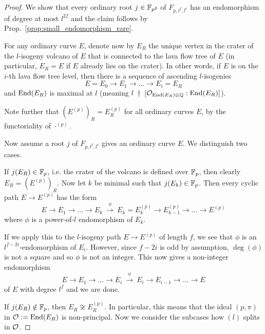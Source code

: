 \begin{proof}
    We show that every ordinary root $j \in \mathbb{F}_{p^2}$ of $F_{p, l^f, l^e}$ has an endomorphism of degree at most $l^{2f}$ and the claim follows by Prop.~\ref{prop:small_endomorphism_rare}.

    For any ordinary curve $E$, denote now by $E_R$ the unique vertex in the crater of the $l$-isogeny volcano of $E$ that is connected to the lava flow tree of $E$ (in particular, $E_R = E$ if $E$ already lies on the crater).
    In other words, if $E$ is on the $i$-th lava flow tree level, then there is a sequence of ascending $l$-isogenies
    \begin{equation*}
        E = E_0 \to E_1 \to ... \to E_i = E_R
    \end{equation*}
    and $\mathrm{End}(E_R)$ is maximal at $l$ (meaning $l \ \nmid \  [\mathcal{O}_{\mathrm{End}(E_R) \otimes \mathbb{Q}} : \mathrm{End}(E_R)]$).

    Note further that $(E^{(p)})_R = E_R^{(p)}$ for all ordinary curves $E$, by the functoriality of $\cdot^{(p)}$.

    Now assume a root $j$ of $F_{p, l^f, l^e}$ gives an ordinary curve $E$.
    We distinguish two cases.

    If $j(E_R) \in \mathbb{F}_p$, i.e. the crater of the volcano is defined over $\mathbb{F}_p$, then clearly $E_R = (E^{(p)})_R$.
    Now let $k$ be minimal such that $j(E_k) \in \mathbb{F}_p$.
    Then every cyclic path $E \to E^{(p)}$ has the form
    \begin{equation*}
        E \to E_1 \to ... \to E_k \ \overset{\phi}{\longrightarrow} \ E_k = E_k^{(p)} \to E_{k - 1}^{(p)} \to ... \to E^{(p)}
    \end{equation*}
    where $\phi$ is a power-of-$l$ endomorphism of $E_k$.

    If we apply this to the $l$-isogeny path $E \to E^{(p)}$ of length $f$, we see that $\phi$ is an $l^{f - 2i}$-endomorphism of $E_i$.
    However, since $f - 2i$ is odd by assumption, $\deg(\phi)$ is not a square and so $\phi$ is not an integer.
    This now gives a non-integer endomorphism
    \begin{equation*}
        E \to E_1 \to ... \to E_i \ \overset{\phi}{\longrightarrow} \ E_i \to E_{i - 1} \to ... \to E
    \end{equation*}
    of $E$ with degree $l^f$ and we are done.

    If $j(E_R) \notin \mathbb{F}_p$, then $E_R \not\cong E^{(p)}_R$.
    In particular, this means that the ideal $(p, \pi)$ in $\mathcal{O} := \mathrm{End}(E_R)$ is non-principal.
    Now we consider the subcases how $(l)$ splits in $\mathcal{O}$.


\end{proof}
